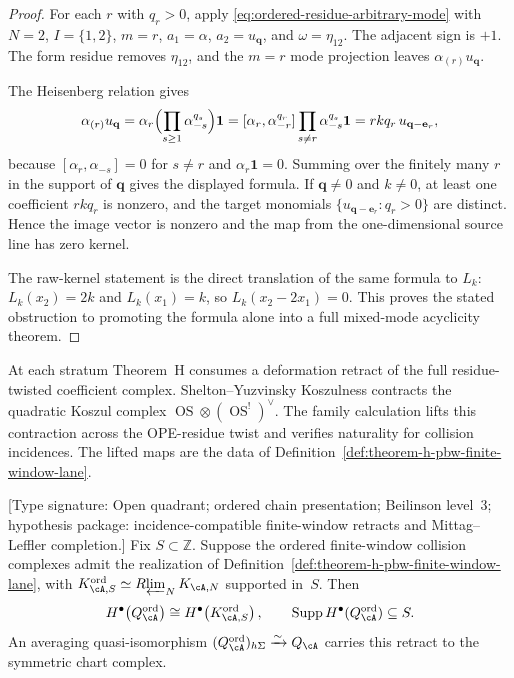 \begin{proof}
For each \(r\) with \(q_r>0\), apply
\eqref{eq:ordered-residue-arbitrary-mode} with \(N=2\),
\(I=\{1,2\}\), \(m=r\), \(a_1=\alpha\), \(a_2=u_{\mathbf q}\), and
\(\omega=\eta_{12}\).  The adjacent sign is \(+1\).  The form residue
removes \(\eta_{12}\), and the \(m=r\) mode projection leaves
\(\alpha_{(r)}u_{\mathbf q}\).

The Heisenberg relation gives
\[
 \alpha_{(r)}u_{\mathbf q}
 =
 \alpha_r
 \Bigl(\prod_{s\ge1}\alpha_{-s}^{q_s}\Bigr)\mathbf1
 =
 [\alpha_r,\alpha_{-r}^{q_r}]
 \prod_{s\neq r}\alpha_{-s}^{q_s}\mathbf1
 =
 r k q_r\,u_{\mathbf q-\mathbf e_r},
\]
because \([\alpha_r,\alpha_{-s}]=0\) for \(s\neq r\) and
\(\alpha_r\mathbf1=0\).  Summing over the finitely many
\(r\) in the support of \(\mathbf q\) gives the displayed formula.
If \(\mathbf q\neq0\) and \(k\neq0\), at least one coefficient
\(rkq_r\) is nonzero, and the target monomials
\(\{u_{\mathbf q-\mathbf e_r}:q_r>0\}\) are distinct.  Hence the
image vector is nonzero and the map from the one-dimensional source
line has zero kernel.

The raw-kernel statement is the direct translation of the same formula
to \(L_k\): \(L_k(x_2)=2k\) and \(L_k(x_1)=k\), so
\(L_k(x_2-2x_1)=0\).  This proves the stated obstruction to promoting
the formula alone into a full mixed-mode acyclicity theorem.
\end{proof}

\begin{remark}
\label{rem:sigma-inverse-chain-level}
At each stratum Theorem~H consumes a deformation retract of the full
residue-twisted coefficient complex.  Shelton--Yuzvinsky Koszulness
contracts the quadratic Koszul complex
\(\operatorname{OS}\otimes(\operatorname{OS}^{!})^{\vee}\).
The family calculation lifts this contraction across the OPE-residue
twist and verifies naturality for collision incidences.  The lifted
maps are the data of
Definition~\ref{def:theorem-h-pbw-finite-window-lane}.
\end{remark}

\begin{theorem}
\label{thm:hochschild-concentration-E1}
\textup{[Type signature: Open quadrant; ordered chain presentation;
Beilinson level~$3$; hypothesis package: incidence-compatible
finite-window retracts and Mittag--Leffler completion.]}
Fix \(S\subset\mathbb Z\).  Suppose the ordered finite-window
collision complexes admit the realization of
Definition~\ref{def:theorem-h-pbw-finite-window-lane}, with
\(K^{\mathrm{ord}}_{\cA,S}\simeq
R\!\varprojlim_NK_{\cA,N}\) supported in~\(S\).  Then
\[
 H^\bullet\!\left(Q^{\mathrm{ord}}_\cA\right)
 \cong H^\bullet\!\left(K^{\mathrm{ord}}_{\cA,S}\right),
 \qquad
 \operatorname{Supp}H^\bullet(Q^{\mathrm{ord}}_\cA)
 \subseteq S.
\]
An averaging quasi-isomorphism
\((Q^{\mathrm{ord}}_\cA)_{h\Sigma}\xrightarrow{\sim}Q_\cA\)
carries this retract to the symmetric chart complex.
\end{theorem}

